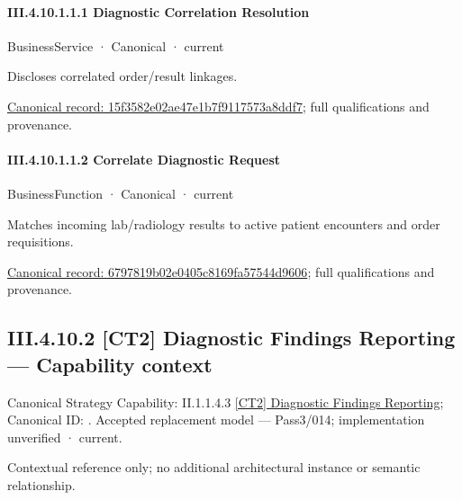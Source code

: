 \paragraph*{III.4.10.1.1.1 Diagnostic Correlation Resolution}
\label{navigation:III.4.10.1.1.1}

\label{element:15f3582e02ae47e1b7f9117573a8ddf7}
{\small BusinessService · Canonical · current}\par

Discloses correlated order/result linkages.


{\footnotesize \href{../../../../../../../../continuum/business/business-service/15f3582e02ae47e1b7f9117573a8ddf7.md}{Canonical record: 15f3582e02ae47e1b7f9117573a8ddf7}; full qualifications and provenance.}\par
\paragraph*{III.4.10.1.1.2 Correlate Diagnostic Request}
\label{navigation:III.4.10.1.1.2}

\label{element:6797819b02e0405c8169fa57544d9606}
{\small BusinessFunction · Canonical · current}\par

Matches incoming lab/radiology results to active patient encounters and order requisitions.


{\footnotesize \href{../../../../../../../../continuum/business/business-function/6797819b02e0405c8169fa57544d9606.md}{Canonical record: 6797819b02e0405c8169fa57544d9606}; full qualifications and provenance.}\par
\subsection*{III.4.10.2 [CT2] Diagnostic Findings Reporting — Capability context}
\label{navigation:III.4.10.2}

{\small Canonical Strategy Capability: II.1.1.4.3 \hyperref[element:dc9a2828b2524ddf8bbfb6adf32926f4]{[CT2] Diagnostic Findings Reporting}; Canonical ID: \texttt{}. Accepted replacement model — Pass3/014; implementation unverified · current.}\par
Contextual reference only; no additional architectural instance or semantic relationship.\par
